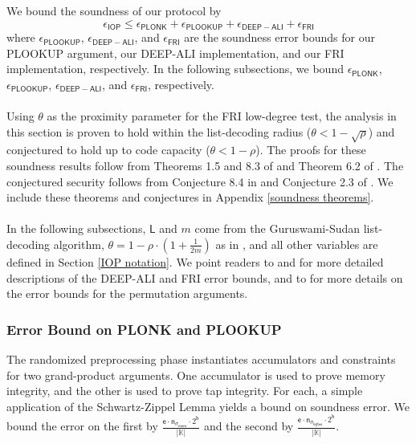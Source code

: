 \documentclass[10pt,letterpaper,titlepage]{article}
\theoremstyle{definition}
\begin{document}
We bound the soundness of our protocol by 
\[
  \epsilon_\mathsf{IOP}
    \leq
  \epsilon_\mathsf{PLONK} + 
  \epsilon_\mathsf{PLOOKUP} + 
  \epsilon_\mathsf{DEEP-ALI} + 
  \epsilon_\mathsf{FRI}
\]
where 
$\epsilon_\mathsf{PLOOKUP}$, $\epsilon_\mathsf{DEEP-ALI}$, and $\epsilon_\mathsf{FRI}$ 
are the soundness error bounds for our PLOOKUP argument, our DEEP-ALI implementation, and our FRI implementation, respectively. 
In the following subsections, we bound $\epsilon_\mathsf{PLONK}$, $\epsilon_\mathsf{PLOOKUP}$, $\epsilon_\mathsf{DEEP-ALI}$, and $\epsilon_\mathsf{FRI}$, respectively. \\
\\Using $\theta$ as the proximity parameter for the FRI low-degree test, the analysis in this section is proven to hold within the list-decoding radius ($\theta < 1-\sqrt{\rho}$) 
and conjectured to hold up to code capacity ($\theta < 1 - \rho$). 
The proofs for these soundness results follow from Theorems 1.5 and 8.3 of \cite{proxGaps} and Theorem 6.2 of \cite{deepFRI}. 
The conjectured security follows from Conjecture 8.4 in \cite{proxGaps} and Conjecture 2.3 of \cite{deepFRI}. 
We include these theorems and conjectures in Appendix \ref{soundness theorems}.\\
\\
In the following subsections, $\mathsf{L}$ and $m$ come from the Guruswami-Sudan list-decoding algorithm, 
$\theta=1-\rho\cdot(1+\frac{1}{2m})$ as in \cite{FRIsummary}, 
and all other variables are defined in Section \ref{IOP notation}. 
We point readers to \cite{FRIsummary} and \cite{ethSTARK} for more detailed descriptions of the DEEP-ALI and FRI error bounds, and to \cite{plonky2} for more details on the error bounds for the permutation arguments. 
\subsubsection{Error Bound on PLONK and PLOOKUP}
The randomized preprocessing phase instantiates accumulators and constraints for two grand-product arguments.
One accumulator is used to prove memory integrity, and the other is used to prove tap integrity.
For each, a simple application of the Schwartz-Zippel Lemma yields a bound on soundness error. 
We bound the error on the first by 
$\frac{\mathsf{e}\cdot\mathsf{n}_{\sigma_\mathsf{mem}}\cdot2^{\mathsf{h}}}{|\mathbb{K}|}$ 
and the second by 
$\frac{\mathsf{e}\cdot\mathsf{n}_{\sigma_\mathsf{bytes}}\cdot2^{\mathsf{h}}}{|\mathbb{K}|}$. 
\end{document}
